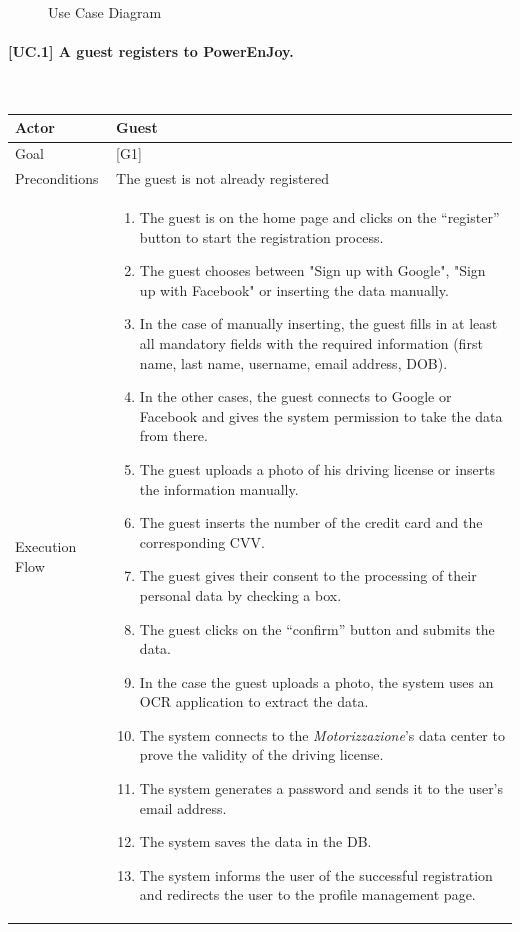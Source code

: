 \documentclass[english]{article}
\begin{document}
	\begin{figure}
		\centering
		\makebox[\textwidth][c]{
			\def\svgwidth{500pt}

			
		}
		\caption{Use Case Diagram}
		\label{use_case_diagram}
	\end{figure}
	\newpage	\paragraph{[UC.1] A guest registers to PowerEnJoy.}
	~\\
	\begin{tabularx}{\textwidth}{  l  X  }
		\hline
		Actor & Guest\\
		\hline
		Goal & [G1]\\
		\hline
		Preconditions & The guest is not already registered\\
		\hline
		Execution Flow & \begin{enumerate}
			\item{The guest is on the home page and clicks on the “register” button to start the registration process.}
			\item{The guest chooses between "Sign up with Google", "Sign up with Facebook" or inserting the data manually.}
			\item{In the case of manually inserting, the guest fills in at least all mandatory fields with the required information (first name, last name, username, email address, DOB).}
			\item{In the other cases, the guest connects to Google or Facebook and gives the system permission to take the data from there.}
			\item{The guest uploads a photo of his driving license or inserts the information manually.}
			\item{The guest inserts the number of the credit card and the corresponding CVV}.
			\item{The guest gives their consent to the processing of their personal data by checking a box.}
			\item{The guest clicks on the “confirm” button and submits the data.}
			\item{In the case the guest uploads a photo, the system uses an OCR application to extract the data.}
			\item{The system connects to the \textit{Motorizzazione}'s data center to prove the validity of the driving license.}
			\item{The system generates a password and sends it to the user's email address.}
			\item{The system  saves the data in the DB.}
			\item{The system informs the user of the successful registration and redirects the user to the profile management page.}
		\end{enumerate}\\
		\hline
	\end{tabularx}
\end{document}
